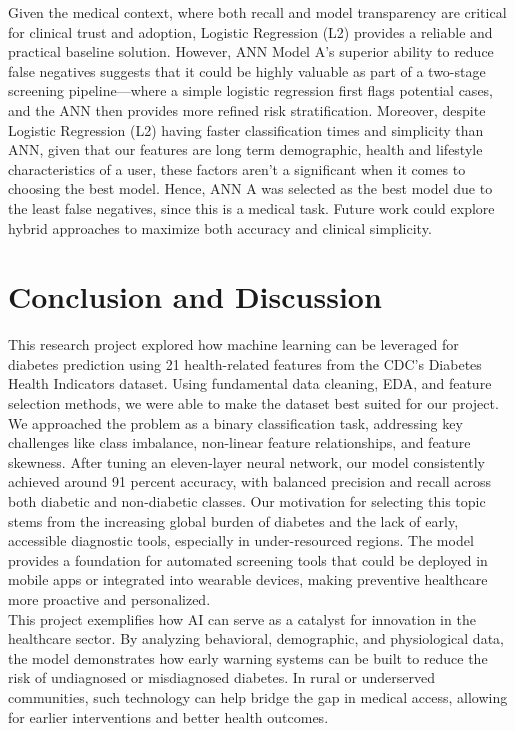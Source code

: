 \documentclass[conference]{IEEEtran}
\begin{document}
Given the medical context, where both recall and model transparency are critical for clinical trust and adoption, Logistic Regression (L2) provides a reliable and practical baseline solution. However, ANN Model A’s superior ability to reduce false negatives suggests that it could be highly valuable as part of a two-stage screening pipeline—where a simple logistic regression first flags potential cases, and the ANN then provides more refined risk stratification. Moreover, despite Logistic Regression (L2) having faster classification times and simplicity than ANN, given that our features are long term demographic, health and lifestyle characteristics of a user, these factors aren't a significant when it comes to choosing the best model. Hence, ANN A was selected as the best model due to the least false negatives, since this is a medical task.  Future work could explore hybrid approaches to maximize both accuracy and clinical simplicity.

\section{Conclusion and Discussion}
This research project explored how machine learning can be leveraged for diabetes prediction using 21 health-related features from the CDC's Diabetes Health Indicators dataset. Using fundamental data cleaning, EDA, and feature selection methods, we were able to make the dataset best suited for our project. We approached the problem as a binary classification task, addressing key challenges like class imbalance, non-linear feature relationships, and feature skewness. After tuning an eleven-layer neural network, our model consistently achieved around 91 percent accuracy, with balanced precision and recall across both diabetic and non-diabetic classes. Our motivation for selecting this topic stems from the increasing global burden of diabetes and the lack of early, accessible diagnostic tools, especially in under-resourced regions. The model provides a foundation for automated screening tools that could be deployed in mobile apps or integrated into wearable devices, making preventive healthcare more proactive and personalized. \\

This project exemplifies how AI can serve as a catalyst for innovation in the healthcare sector. By analyzing behavioral, demographic, and physiological data, the model demonstrates how early warning systems can be built to reduce the risk of undiagnosed or misdiagnosed diabetes. In rural or underserved communities, such technology can help bridge the gap in medical access, allowing for earlier interventions and better health outcomes. \\
\end{document}

